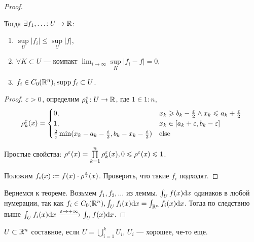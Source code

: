 \begin{proof}
\begin{lemma}
        Тогда $\exists f_1, \ldots\!: U \to \mathbb{R}$:
        \begin{enumerate}
            \item $\sup\limits_U |f_i| \le  \sup\limits_U |f|$,
            \item $\forall K \subset U$ --- компакт  $\lim_{i \to \infty} \sup\limits_K |f_i - f| = 0$,
            \item $f_i \in C_0(\mathbb{R}^n), \operatorname{supp} f_i \subset U$.
        \end{enumerate}
    \end{lemma}
    \begin{proof}
        $\varepsilon > 0$, определим  $\rho_k^{\varepsilon}\!: U \to \mathbb{R}$, где $1 \in 1:n$,  \[\rho_k^{\varepsilon}(x) = \begin{cases}
            0, & x_k \geqslant  b_k - \frac{\varepsilon}{2} \land x_k \leqslant  a_k + \frac{\varepsilon}{2} \\
            1, & x_k \in \left[ a_k + \varepsilon, b_k - \varepsilon \right] \\
            \frac{2}{\varepsilon}\min(x_k - a_k - \frac{\varepsilon}{2}, b_k - x_k-\frac{\varepsilon}{2}) & \text{else}
        \end{cases}\]
        
        Простые свойства: $\rho^{\varepsilon}(x) = \prod\limits_{k=1}^n \rho_k^{\varepsilon}(x), 0 \leqslant  \rho^{\varepsilon}(x) \leqslant 1$. 

        Положим $f_i(x) \coloneqq f(x) \cdot \rho^{\frac{\varepsilon}{i}}(x)$. Проверить, что такие $f_i$ подходят.
    \end{proof}

    Вернемся к теореме. Возьмем $f_1, f_2, \ldots$ из леммы. $\int_U f(x) \mathrm{d}x$ одинаков в любой нумерации, так как  $f_i \in C_0(\mathbb{R}^n), \int_U f_i(x)\mathrm{d}x = \int_{\mathbb{R}^n} f_i(x)\mathrm{d}x$. Тогда по следствию выше  $\int_U f_i(x)\mathrm{d}x \xrightarrow{\varepsilon \to +\infty} \int_U f(x)\mathrm{d}x$.
\end{proof}
\begin{definition}
    $U \subset \mathbb{R}^n$ составное, если $U = \bigcup\limits_{i=1}^k U_i$,  $U_i$ --- хорошее, че-то еще.
\end{definition}

